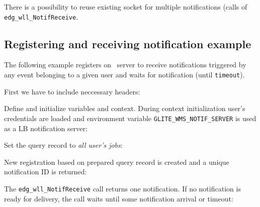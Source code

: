 There is a possibility to reuse existing socket for multiple notifications (calls of 
\verb'edg_wll_NotifReceive'. 



\subsection{Registering and receiving notification example}

The following example registers on \LB\ server to receive
notifications triggered by any event belonging to a
given user and waits for notification (until \verb'timeout').


First we have to include neccessary headers:


Define and initialize variables and context. During context
initialization user's credentials are loaded and environment variable
\verb'GLITE_WMS_NOTIF_SERVER' is used as a LB notification server:
 


Set the query record to \emph{all user's jobs}:


New registration based on prepared query record is created and a
unique notification ID is returned: 


The \verb'edg_wll_NotifReceive' call returns one notification. If no notification is 
ready for delivery, the call waits until some notification arrival or timeout:





